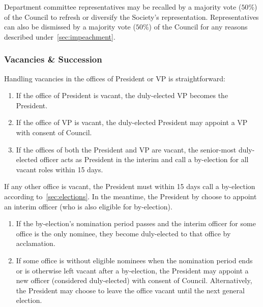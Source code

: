 Department committee representatives may be recalled by a majority vote
($50\%$) of the Council to refresh or diversify the Society's representation.
Representatives can also be dismissed by a majority vote ($50\%$) of the
Council for any reasons described under~\ref{sec:impeachment}.

\subsubsection{Vacancies \& Succession}\label{sec:vacancy}
Handling vacancies in the offices of President or VP is straightforward:
\begin{enumerate}
      \item If the office of President is vacant, the duly-elected VP becomes the
            President.
      \item If the office of VP is vacant, the duly-elected President may appoint a VP with
            consent of Council.
      \item If the offices of both the President and VP are vacant, the senior-most
            duly-elected officer acts as President in the interim and call a by-election
            for all vacant roles within 15 days.
\end{enumerate}
If any other office is vacant, the President must within 15 days call a by-election according to~\ref{sec:elections}. In the meantime, the President by choose to appoint an interim officer (who is also eligible for by-election).

\begin{enumerate}
      \item If the by-election's nomination period passes and the interim officer for some
            office is the only nominee, they become duly-elected to that office by
            acclamation.
      \item If some office is without eligible nominees when the nomination period ends or
            is otherwise left vacant after a by-election, the President may appoint a new
            officer (considered duly-elected) with consent of Council. Alternatively, the
            President may choose to leave the office vacant until the next general
            election.
\end{enumerate}